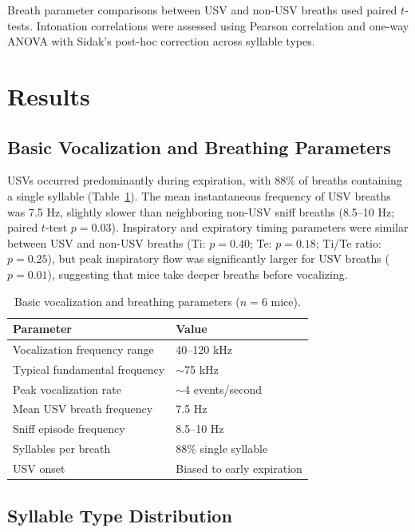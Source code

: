 \documentclass[11pt]{article}
\begin{document}
Breath parameter comparisons between USV and non-USV breaths used paired $t$-tests. Intonation correlations were assessed using Pearson correlation and one-way ANOVA with Sidak's post-hoc correction across syllable types.

\section{Results}

\subsection{Basic Vocalization and Breathing Parameters}

USVs occurred predominantly during expiration, with 88\% of breaths containing a single syllable (Table~\ref{tab:basic}). The mean instantaneous frequency of USV breaths was 7.5 Hz, slightly slower than neighboring non-USV sniff breaths (8.5--10 Hz; paired $t$-test $p = 0.03$). Inspiratory and expiratory timing parameters were similar between USV and non-USV breaths (Ti: $p = 0.40$; Te: $p = 0.18$; Ti/Te ratio: $p = 0.25$), but peak inspiratory flow was significantly larger for USV breaths ($p = 0.01$), suggesting that mice take deeper breaths before vocalizing.

\begin{table}[h]
\centering
\caption{Basic vocalization and breathing parameters ($n = 6$ mice).}
\label{tab:basic}
\begin{tabular}{ll}
\toprule
Parameter & Value \\
\midrule
Vocalization frequency range & 40--120 kHz \\
Typical fundamental frequency & $\sim$75 kHz \\
Peak vocalization rate & $\sim$4 events/second \\
Mean USV breath frequency & 7.5 Hz \\
Sniff episode frequency & 8.5--10 Hz \\
Syllables per breath & 88\% single syllable \\
USV onset & Biased to early expiration \\
\bottomrule
\end{tabular}
\end{table}

\subsection{Syllable Type Distribution}
\end{document}
